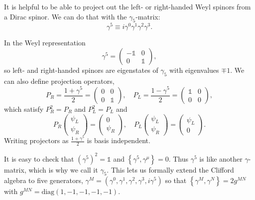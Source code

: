\documentclass[11pt]{article}
\theoremstyle{definition}
\begin{document}
It is helpful to be able to project out the left- or right-handed Weyl spinors from a Dirac spinor. We can do that with the \(\gamma_5\)-matrix:
\begin{equation}
\gamma^5 \equiv i \gamma^0 \gamma^1 \gamma^2 \gamma^3.
\end{equation}

In the Weyl representation
\begin{equation}
\gamma^5 = \begin{pmatrix} -\mathds{1} & 0 \\ 0 & \mathds{1} \end{pmatrix},
\end{equation}
so left- and right-handed spinors are eigenstates of \(\gamma_5\) with eigenvalues \(\mp 1\). We can also define projection operators,
\begin{equation}
P_R = \frac{1 + \gamma^5}{2} = \begin{pmatrix} 0 & 0 \\ 0 & \mathds{1} \end{pmatrix}, \quad 
P_L = \frac{1 - \gamma^5}{2} = \begin{pmatrix} \mathds{1} & 0 \\ 0 & 0 \end{pmatrix},
\end{equation}
which satisfy \(P_R^2 = P_R\) and \(P_L^2 = P_L\) and
\begin{equation}
P_R \begin{pmatrix} \psi_L \\ \psi_R \end{pmatrix} = \begin{pmatrix} 0 \\ \psi_R \end{pmatrix}, \quad 
P_L \begin{pmatrix} \psi_L \\ \psi_R \end{pmatrix} = \begin{pmatrix} \psi_L \\ 0 \end{pmatrix}.
\end{equation}
Writing projectors as \(\frac{1 + \gamma^5}{2}\) is basis independent.

It is easy to check that \(\left( \gamma^5 \right)^2 = \mathds{1}\) and \(\left\{ \gamma^5, \gamma^\mu \right\} = 0\). Thus \(\gamma^5\) is like another \(\gamma\)-matrix, which is why we call it \(\gamma_5\). This lets us formally extend the Clifford algebra to five generators, \(\gamma^M = (\gamma^0, \gamma^1, \gamma^2, \gamma^3, i\gamma^5)\) so that \(\left\{ \gamma^M, \gamma^N \right\} = 2g^{MN}\) with \(g^{MN} = \text{diag}(1, -1, -1, -1, -1)\).
\end{document}
